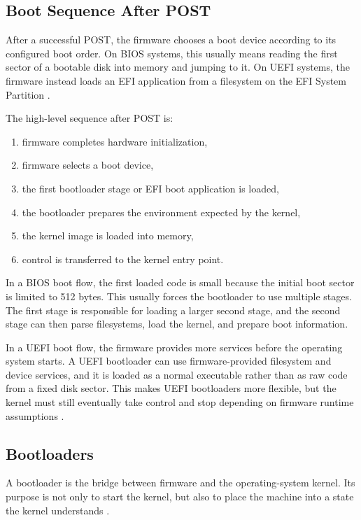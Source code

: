 \subsection{Boot Sequence After POST}
After a successful POST, the firmware chooses a boot device according to its configured boot order. On BIOS systems, this usually means reading the first sector of a bootable disk into memory and jumping to it. On UEFI systems, the firmware instead loads an EFI application from a filesystem on the EFI System Partition \cite{cyberraidenUEFIBoot, manybutfinite}.

The high-level sequence after POST is:
\begin{enumerate}
  \item firmware completes hardware initialization,
  \item firmware selects a boot device,
  \item the first bootloader stage or EFI boot application is loaded,
  \item the bootloader prepares the environment expected by the kernel,
  \item the kernel image is loaded into memory,
  \item control is transferred to the kernel entry point.
\end{enumerate}

In a BIOS boot flow, the first loaded code is small because the initial boot sector is limited to 512 bytes. This usually forces the bootloader to use multiple stages. The first stage is responsible for loading a larger second stage, and the second stage can then parse filesystems, load the kernel, and prepare boot information\cite{osdevBootSequence, manybutfinite}.

In a UEFI boot flow, the firmware provides more services before the operating system starts. A UEFI bootloader can use firmware-provided filesystem and device services, and it is loaded as a normal executable rather than as raw code from a fixed disk sector. This makes UEFI bootloaders more flexible, but the kernel must still eventually take control and stop depending on firmware runtime assumptions \cite{cyberraidenUEFIBoot}.

\subsection{Bootloaders}
A bootloader is the bridge between firmware and the operating-system kernel. Its purpose is not only to start the kernel, but also to place the machine into a state the kernel understands \cite{ionosBootloader, littleosbook}.

